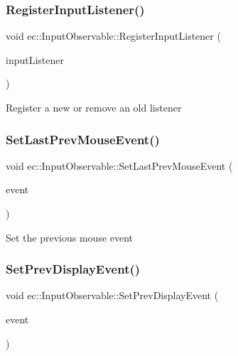 \mbox{\label{classec_1_1_input_observable_a64505667464dde9b0e031fefe2468c43}} 
\subsubsection{\texorpdfstring{Register\+Input\+Listener()}{RegisterInputListener()}}
{\footnotesize\ttfamily void ec\+::\+Input\+Observable\+::\+Register\+Input\+Listener (\begin{DoxyParamCaption}\item[{\mbox{\hyperlink{classec_1_1_input_listener}{Input\+Listener}} $\ast$}]{input\+Listener }\end{DoxyParamCaption})\hspace{0.3cm}{\ttfamily [virtual]}}

Register a new or remove an old listener \mbox{\label{classec_1_1_input_observable_a317a5d73fe50080167524b729ecf4996}} 
\subsubsection{\texorpdfstring{Set\+Last\+Prev\+Mouse\+Event()}{SetLastPrevMouseEvent()}}
{\footnotesize\ttfamily void ec\+::\+Input\+Observable\+::\+Set\+Last\+Prev\+Mouse\+Event (\begin{DoxyParamCaption}\item[{const \mbox{\hyperlink{structec_1_1_mouse_event}{Mouse\+Event}} \&}]{event }\end{DoxyParamCaption})}

Set the previous mouse event \mbox{\label{classec_1_1_input_observable_ad4774821c9e54a31409b575b54639326}} 
\subsubsection{\texorpdfstring{Set\+Prev\+Display\+Event()}{SetPrevDisplayEvent()}}
{\footnotesize\ttfamily void ec\+::\+Input\+Observable\+::\+Set\+Prev\+Display\+Event (\begin{DoxyParamCaption}\item[{const \mbox{\hyperlink{structec_1_1_display_event}{Display\+Event}} \&}]{event }\end{DoxyParamCaption})}

